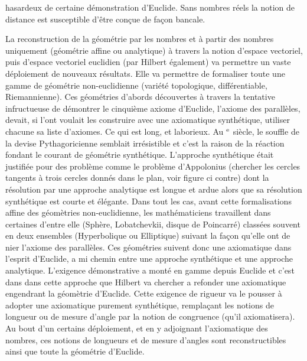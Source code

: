 hasardeux de certaine démonstration d'Euclide. Sans nombres réels la notion de distance est susceptible d'être conçue de façon bancale. 



La reconstruction de la géométrie par les nombres et à partir des nombres uniquement (géométrie affine ou analytique) à travers la notion d'espace vectoriel, puis d'espace vectoriel euclidien (par Hilbert également) va permettre un vaste déploiement de nouveaux résultats. Elle va permettre de formaliser toute une gamme de géométrie non-euclidienne (variété topologique, différentiable, Riemannienne). Ces géométries d'abords découvertes à travers la tentative infructueuse de démontrer le cinquième axiome d'Euclide, l'axiome des parallèles, devait, si l'ont voulait les construire avec une axiomatique synthétique, utiliser chacune sa liste d'axiomes. Ce qui est long, et laborieux. Au $^{\mathrm{e}}$ siècle, le souffle de la devise Pythagoricienne semblait irrésistible et c'est la raison de la réaction fondant le courant de géométrie synthétique. 
L'approche synthétique était justifiée pour des problème comme le problème d'Appolonius (chercher les cercles tangents à trois cercles donnés dans le plan, voir figure ci contre) dont la résolution par une approche analytique est longue et ardue alors que sa résolution synthétique est courte et élégante. Dans tout les cas, avant cette formalisations affine des géomètries non-euclidienne, les mathématiciens travaillent dans certaines d'entre elle (Sphère, Lobatchevkii, disque de Poincarré) classées souvent en deux ensembles (Hyperbolique ou Elliptique) suivant la façon qu'elle ont de nier l'axiome des parallèles. Ces géométries suivent donc une axiomatique dans l'esprit d'Euclide, a mi chemin entre une approche synthétique et une approche analytique. L'exigence démonstrative a monté en gamme depuis Euclide et c'est dans dans cette approche que Hilbert va chercher a refonder une axiomatique engendrant la géomètrie d'Euclide. Cette exigence de rigueur va le pousser à adopter une axiomatique purement synthétique, remplaçant les notions de longueur ou de mesure d'angle par la notion de congruence (qu'il axiomatisera). Au bout d'un certains déploiement, et en y adjoignant l'axiomatique des nombres, ces notions de longueurs et de mesure d'angles sont reconstructibles ainsi que toute la géométrie d'Euclide. 





